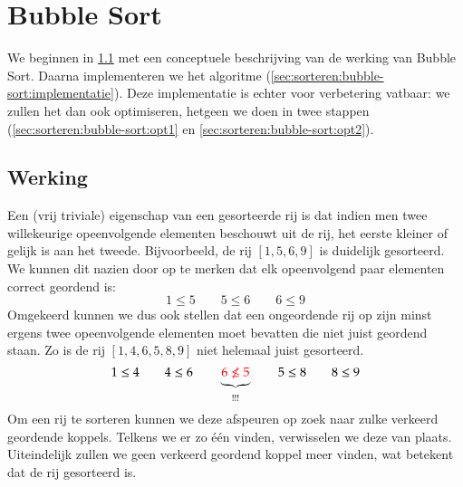 \section{Bubble Sort} \label{sec:sorteren:bubble-sort}
We beginnen in \cref{sec:sorteren:bubble-sort:werking} met een conceptuele
beschrijving van de werking van Bubble Sort. Daarna
implementeren we het algoritme (\cref{sec:sorteren:bubble-sort:implementatie}).
Deze implementatie is echter voor verbetering vatbaar: we zullen
het dan ook optimiseren, hetgeen we doen in twee stappen
(\cref{sec:sorteren:bubble-sort:opt1} en \cref{sec:sorteren:bubble-sort:opt2}).

\subsection{Werking} \label{sec:sorteren:bubble-sort:werking}
Een (vrij triviale) eigenschap van een gesorteerde rij is dat indien men
twee willekeurige opeenvolgende elementen beschouwt uit de rij, het eerste kleiner of gelijk is aan het tweede.
Bijvoorbeeld, de rij $[1, 5, 6, 9]$ is duidelijk gesorteerd. We kunnen dit nazien
door op te merken dat elk opeenvolgend paar elementen correct geordend is:
\[
  1 \leq 5 \qquad 5 \leq 6 \qquad 6 \leq 9
\]
Omgekeerd kunnen we dus ook stellen dat een ongeordende rij op zijn minst ergens
twee opeenvolgende elementen moet bevatten die niet juist geordend staan. Zo is
de rij $[1,4,6,5,8,9]$ niet helemaal juist gesorteerd.
\[
  1 \leq 4 \qquad 4 \leq 6 \qquad \underbrace{\color{red} 6 \not\leq 5}_{!!!} \qquad 5 \leq 8 \qquad 8 \leq 9
\]
Om een rij te sorteren kunnen we deze afspeuren
op zoek naar zulke verkeerd geordende koppels. Telkens we er zo \'e\'en vinden,
verwisselen we deze van plaats. Uiteindelijk zullen we
geen verkeerd geordend koppel meer vinden, wat betekent dat de rij gesorteerd is.

